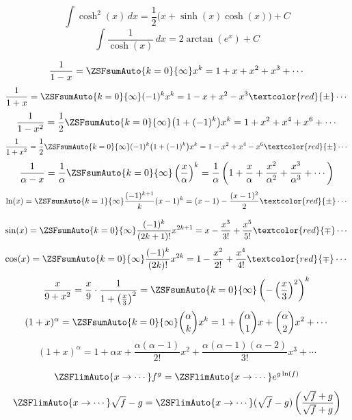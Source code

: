 \begin{formulabox}[breakable]
    \[
    \int \cosh^2(x)\,dx = \frac{1}{2}\bigl(x+\sinh(x)\cosh(x)\bigr)+C
    \]
    \[
    \int \frac{1}{\cosh(x)}\,dx = 2\arctan(e^x)+C
    \]
\end{formulabox}

\begin{formulabox}[breakable]
    \[
    \frac{1}{1-x} = \ZSFsumAuto{k=0}{\infty}x^k = 1+x+x^2+x^3+\cdots
    \]
    \[
    \frac{1}{1+x} = \ZSFsumAuto{k=0}{\infty}(-1)^k x^k = 1-x+x^2-x^3\textcolor{red}{\pm}\cdots
    \]
    \[
    \frac{1}{1-x^2} = \frac{1}{2}\ZSFsumAuto{k=0}{\infty}\bigl(1+(-1)^k\bigr)x^k = 1+x^2+x^4+x^6+\cdots
    \]
    \[
    \frac{1}{1+x^2} = \frac{1}{2}\ZSFsumAuto{k=0}{\infty}(-1)^k\bigl(1+(-1)^k\bigr)x^k = 1-x^2+x^4-x^6\textcolor{red}{\pm}\cdots
    \]
    \[
    \frac{1}{\alpha-x} = \frac{1}{\alpha}\ZSFsumAuto{k=0}{\infty}\left(\frac{x}{\alpha}\right)^k
    = \frac{1}{\alpha}\left(1+\frac{x}{\alpha}+\frac{x^2}{\alpha^2}+\frac{x^3}{\alpha^3}+\cdots\right)
    \]
    \[
    \ln(x) = \ZSFsumAuto{k=1}{\infty}\frac{(-1)^{k+1}}{k}(x-1)^k = (x-1)-\frac{(x-1)^2}{2}\textcolor{red}{\pm}\cdots
    \]
\end{formulabox}

\begin{formulabox}[breakable]
    \[
    \sin(x) = \ZSFsumAuto{k=0}{\infty}\frac{(-1)^k}{(2k+1)!}x^{2k+1} = x-\frac{x^3}{3!}+\frac{x^5}{5!}\textcolor{red}{\mp}\cdots
    \]
    \[
    \cos(x) = \ZSFsumAuto{k=0}{\infty}\frac{(-1)^k}{(2k)!}x^{2k} = 1-\frac{x^2}{2!}+\frac{x^4}{4!}\textcolor{red}{\mp}\cdots
    \]
    \[
    \frac{x}{9+x^2} = \frac{x}{9}\cdot\frac{1}{1+\left(\frac{x}{3}\right)^2}
    = \ZSFsumAuto{k=0}{\infty}\left(-\left(\frac{x}{3}\right)^2\right)^k
    \]
    \[
    (1+x)^{\alpha} = \ZSFsumAuto{k=0}{\infty}\binom{\alpha}{k}x^k
    = 1+\binom{\alpha}{1}x+\binom{\alpha}{2}x^2+\cdots
    \]
    \[
    (1+x)^{\alpha} = 1+\alpha x+\frac{\alpha(\alpha-1)}{2!}x^2+\frac{\alpha(\alpha-1)(\alpha-2)}{3!}x^3+\cdots
    \]
\end{formulabox}

\begin{formulabox}[breakable]
    \[
    \ZSFlimAuto{x\to\cdots} f^g = \ZSFlimAuto{x\to\cdots} e^{g\ln(f)}
    \]
    \[
    \ZSFlimAuto{x\to\cdots} \sqrt{f}-g = \ZSFlimAuto{x\to\cdots}(\sqrt{f}-g)\left(\frac{\sqrt{f}+g}{\sqrt{f}+g}\right)
    \]
\end{formulabox}

